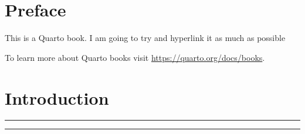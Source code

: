\documentclass[
  letterpaper,
  DIV=11,
  numbers=noendperiod,
  oneside]{scrreprt}
\renewcommand*\contentsname{Table of contents}
\newcommand\contentsname{Table of contents}
\begin{document}
\renewcommand*\contentsname{Table of contents}
{
\hypersetup{linkcolor=}
\setcounter{tocdepth}{2}
\tableofcontents
}

\hypertarget{preface}{%
\chapter*{Preface}\label{preface}}

This is a Quarto book. I am going to try and hyperlink it as much as
possible

To learn more about Quarto books visit
\url{https://quarto.org/docs/books}.


\hypertarget{introduction}{%
\chapter{Introduction}\label{introduction}}

\begin{center}\rule{0.5\linewidth}{0.5pt}\end{center}

\begin{center}\rule{0.5\linewidth}{0.5pt}\end{center}
\end{document}
